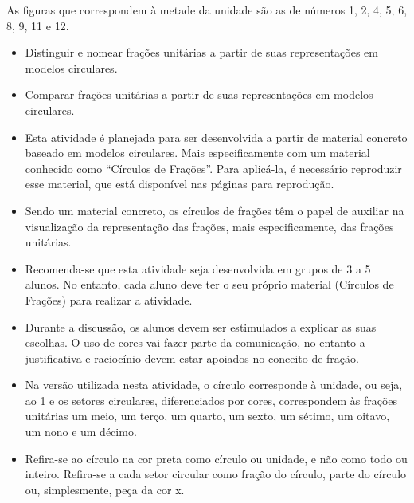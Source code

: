 \begin{multicols}{2}
\begin{solucao}{}{}
  As figuras que correspondem à metade da unidade são as de números 1, 2, 4, 5, 6, 8, 9, 11 e 12.
\end{solucao}

\begin{objetivos}{}{}
\begin{itemize}
 \item Distinguir e nomear frações unitárias a partir de suas representações em modelos circulares.
\item  Comparar frações unitárias a partir de suas representações em modelos circulares.
\end{itemize}
\end{objetivos}

\begin{orientacoes}
\begin{itemize}
\item    Esta atividade é planejada para ser desenvolvida a partir de material concreto baseado em modelos circulares. Mais especificamente com um material conhecido como ``Círculos de Frações''. Para aplicá-la, é necessário reproduzir esse material, que está disponível nas páginas para reprodução.
\item Sendo um material concreto, os círculos de frações têm o papel de auxiliar na visualização da representação das frações, mais especificamente, das frações unitárias.
\item Recomenda-se que esta atividade seja desenvolvida em grupos de 3 a 5 alunos. No entanto, cada aluno deve ter o seu próprio material (Círculos de Frações) para realizar a atividade.
\item Durante a discussão, os alunos devem ser estimulados a explicar as suas escolhas. O uso de cores vai fazer parte da comunicação, no entanto a justificativa e raciocínio devem estar apoiados no conceito de fração. %
 \item Na versão utilizada nesta atividade, o círculo corresponde à unidade, ou seja, ao 1 e os setores circulares, diferenciados por cores, correspondem às frações unitárias um meio, um terço, um quarto, um sexto, um sétimo, um oitavo, um nono e um décimo.
    \item Refira-se ao círculo na cor preta como círculo ou unidade, e não como todo ou inteiro. Refira-se a cada setor circular como fração do círculo, parte do círculo ou, simplesmente, peça da cor x.

\end{itemize}
\end{orientacoes}
\end{multicols}
